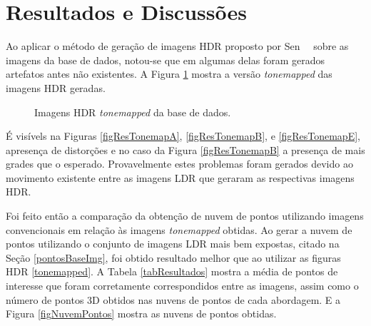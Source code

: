\section{Resultados e Discussões} \label{pontosResultados}

Ao aplicar o método de geração de imagens HDR proposto por Sen~\etal~\cite{hdrMovimento} sobre as imagens da base de dados, notou-se que em algumas delas foram gerados artefatos antes não existentes. A Figura \ref{figResTonemap} mostra a versão \textit{tonemapped} das imagens HDR geradas.

\begin{figure}[H]
  \centering 
  \quad %
  \quad %
  \quad %
  \quad %
  \caption{Imagens HDR \textit{tonemapped} da base de dados.}
  \label{figResTonemap}
\end{figure}

É visívels na Figuras \ref{figResTonemapA}, \ref{figResTonemapB}, e \ref{figResTonemapE}, apresença de distorções e no caso da Figura \ref{figResTonemapB} a presença de mais grades que o esperado. Provavelmente estes problemas foram gerados devido ao movimento existente entre as imagens LDR que geraram as respectivas imagens HDR.

Foi feito então a comparação da obtenção de nuvem de pontos utilizando imagens convencionais em relação às imagens \textit{tonemapped} obtidas. Ao gerar a nuvem de pontos utilizando o conjunto de imagens LDR mais bem expostas, citado na Seção \ref{pontosBaseImg}, foi obtido resultado melhor que ao utilizar as figuras HDR \ref{tonemapped}. A Tabela \ref{tabResultados} mostra a média de pontos de interesse que foram corretamente correspondidos entre as imagens, assim como o número de pontos 3D obtidos nas nuvens de pontos de cada abordagem. E a Figura \ref{figNuvemPontos} mostra as nuvens de pontos obtidas.

